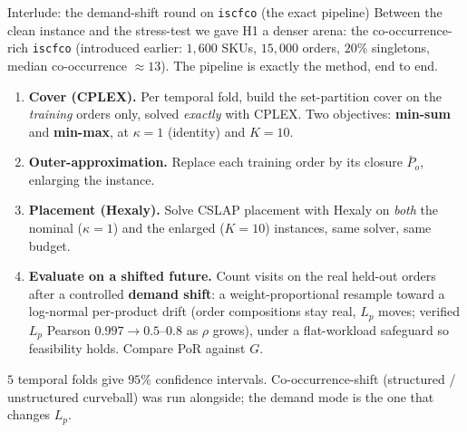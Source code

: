 \documentclass[11pt,aspectratio=169]{beamer}
\newcommand{\term}[1]{\textcolor{blue!60!black}{\textbf{#1}}}
\begin{document}
\begin{frame}{Interlude: the demand-shift round on \texttt{iscfco} (the exact pipeline)}
  Between the clean instance and the stress-test we gave H1 a denser arena: the co-occurrence-rich \texttt{iscfco} (introduced earlier: $1{,}600$ SKUs, $15{,}000$ orders, $20\%$ singletons, median co-occurrence $\approx 13$). The pipeline is exactly the method, end to end.
  \begin{enumerate}
    \item \textbf{Cover (CPLEX).} Per temporal fold, build the set-partition cover on the \emph{training} orders only, solved \emph{exactly} with CPLEX. Two objectives: \term{min-sum} and \term{min-max}, at $\kappa{=}1$ (identity) and $K{=}10$.
    \item \textbf{Outer-approximation.} Replace each training order by its closure $\bar P_o$, enlarging the instance.
    \item \textbf{Placement (Hexaly).} Solve CSLAP placement with Hexaly on \emph{both} the nominal ($\kappa{=}1$) and the enlarged ($K{=}10$) instances, same solver, same budget.
    \item \textbf{Evaluate on a shifted future.} Count visits on the real held-out orders after a controlled \term{demand shift}: a weight-proportional resample toward a log-normal per-product drift (order compositions stay real, $L_p$ moves; verified $L_p$ Pearson $0.997\!\to\!0.5\text{--}0.8$ as $\rho$ grows), under a flat-workload safeguard so feasibility holds. Compare PoR against $G$.
  \end{enumerate}
  \footnotesize $5$ temporal folds give $95\%$ confidence intervals. Co-occurrence-shift (structured / unstructured curveball) was run alongside; the demand mode is the one that changes $L_p$.
\end{frame}
\end{document}
